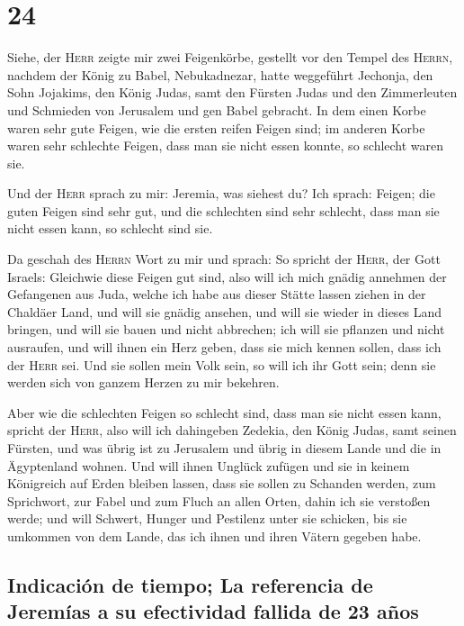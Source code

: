 \hypertarget{section-23}{%
\section{24}\label{section-23}}

 Siehe, der \textsc{Herr} zeigte mir zwei Feigenkörbe,
gestellt vor den Tempel des \textsc{Herrn}, nachdem der König zu Babel,
Nebukadnezar, hatte weggeführt Jechonja, den Sohn Jojakims, den König
Judas, samt den Fürsten Judas und den Zimmerleuten und Schmieden von
Jerusalem und gen Babel gebracht.  In dem einen Korbe
waren sehr gute Feigen, wie die ersten reifen Feigen sind; im anderen
Korbe waren sehr schlechte Feigen, dass man sie nicht essen konnte, so
schlecht waren sie.

 Und der \textsc{Herr} sprach zu mir: Jeremia, was siehest
du? Ich sprach: Feigen; die guten Feigen sind sehr gut, und die
schlechten sind sehr schlecht, dass man sie nicht essen kann, so
schlecht sind sie.

 Da geschah des \textsc{Herrn} Wort zu mir und sprach:
 So spricht der \textsc{Herr}, der Gott Israels: Gleichwie
diese Feigen gut sind, also will ich mich gnädig annehmen der Gefangenen
aus Juda, welche ich habe aus dieser Stätte lassen ziehen in der
Chaldäer Land,  und will sie gnädig ansehen, und will sie
wieder in dieses Land bringen, und will sie bauen und nicht abbrechen;
ich will sie pflanzen und nicht ausraufen,  und will ihnen
ein Herz geben, dass sie mich kennen sollen, dass ich der \textsc{Herr}
sei. Und sie sollen mein Volk sein, so will ich ihr Gott sein; denn sie
werden sich von ganzem Herzen zu mir bekehren.

 Aber wie die schlechten Feigen so schlecht sind, dass man
sie nicht essen kann, spricht der \textsc{Herr}, also will ich
dahingeben Zedekia, den König Judas, samt seinen Fürsten, und was übrig
ist zu Jerusalem und übrig in diesem Lande und die in Ägyptenland
wohnen.  Und will ihnen Unglück zufügen und sie in keinem
Königreich auf Erden bleiben lassen, dass sie sollen zu Schanden werden,
zum Sprichwort, zur Fabel und zum Fluch an allen Orten, dahin ich sie
verstoßen werde;  und will Schwert, Hunger und Pestilenz
unter sie schicken, bis sie umkommen von dem Lande, das ich ihnen und
ihren Vätern gegeben habe.

\hypertarget{indicaciuxf3n-de-tiempo-la-referencia-de-jeremuxedas-a-su-efectividad-fallida-de-23-auxf1os}{%
\subsection{Indicación de tiempo; La referencia de Jeremías a su
efectividad fallida de 23
años}\label{indicaciuxf3n-de-tiempo-la-referencia-de-jeremuxedas-a-su-efectividad-fallida-de-23-auxf1os}}

